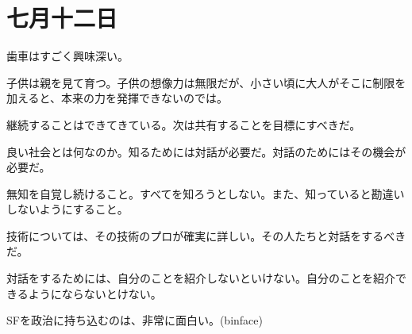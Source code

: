 \chapter{七月十二日}

歯車はすごく興味深い。

子供は親を見て育つ。子供の想像力は無限だが、小さい頃に大人がそこに制限を加えると、本来の力を発揮できないのでは。

継続することはできてきている。次は共有することを目標にすべきだ。

良い社会とは何なのか。知るためには対話が必要だ。対話のためにはその機会が必要だ。

無知を自覚し続けること。すべてを知ろうとしない。また、知っていると勘違いしないようにすること。

技術については、その技術のプロが確実に詳しい。その人たちと対話をするべきだ。

対話をするためには、自分のことを紹介しないといけない。自分のことを紹介できるようにならないとけない。

SFを政治に持ち込むのは、非常に面白い。(binface)
